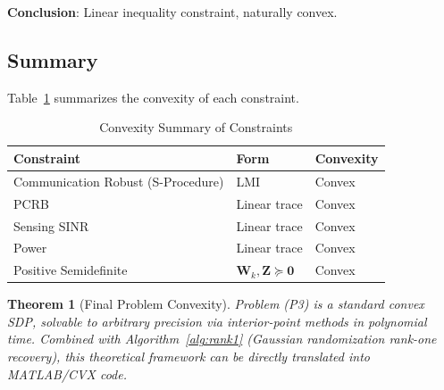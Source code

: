 \documentclass[12pt,a4paper]{article}
\newcommand{\mat}[1]{\mathbf{#1}}
\newtheorem{theorem}{Theorem}
\begin{document}
\textbf{Conclusion}: Linear inequality constraint, naturally convex.

\subsection{Summary}

Table~\ref{tab:convexity} summarizes the convexity of each constraint.

\begin{table}[htbp]
\centering
\caption{Convexity Summary of Constraints}\label{tab:convexity}
\begin{tabular}{lll}
\toprule
Constraint & Form & Convexity \\
\midrule
Communication Robust (S-Procedure) & LMI & Convex \\
PCRB & Linear trace & Convex \\
Sensing SINR & Linear trace & Convex \\
Power & Linear trace & Convex \\
Positive Semidefinite & $\mat{W}_k, \mat{Z} \succeq \mat{0}$ & Convex \\
\bottomrule
\end{tabular}
\end{table}

\begin{theorem}[Final Problem Convexity]
Problem (P3) is a standard convex SDP, solvable to arbitrary precision via interior-point methods in polynomial time. Combined with Algorithm~\ref{alg:rank1} (Gaussian randomization rank-one recovery), this theoretical framework can be directly translated into MATLAB/CVX code.
\end{theorem}

\end{document}
